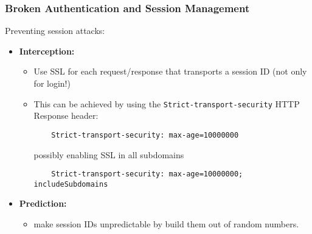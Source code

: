 \documentclass{beamer}
\begin{document}
\begin{frame}[fragile]
  \frametitle{Broken Authentication and Session Management}
Preventing session attacks:
\begin{itemize}\itemsep=1.5ex
\item \textbf{Interception:}
\begin{itemize}
\item Use SSL for each request/response that transports a session ID (not only for login!)
\item This can be achieved by using the \lstinline|Strict-transport-security| HTTP Response header:
\begin{lstlisting}
    Strict-transport-security: max-age=10000000
\end{lstlisting}
possibly enabling SSL in all subdomains
\begin{lstlisting}
    Strict-transport-security: max-age=10000000; includeSubdomains
\end{lstlisting}
\end{itemize}
\item \textbf{Prediction:}
  \begin{itemize}
  \item make session IDs unpredictable by build them out of random numbers.
  \end{itemize}
\end{itemize}
\end{frame}


\end{document}
